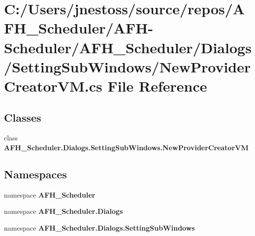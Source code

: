 \section{C\+:/\+Users/jnestoss/source/repos/\+A\+F\+H\+\_\+\+Scheduler/\+A\+F\+H-\/\+Scheduler/\+A\+F\+H\+\_\+\+Scheduler/\+Dialogs/\+Setting\+Sub\+Windows/\+New\+Provider\+Creator\+VM.cs File Reference}
\label{_new_provider_creator_v_m_8cs}
\subsection*{Classes}
\begin{DoxyCompactItemize}
\item 
class \textbf{ A\+F\+H\+\_\+\+Scheduler.\+Dialogs.\+Setting\+Sub\+Windows.\+New\+Provider\+Creator\+VM}
\end{DoxyCompactItemize}
\subsection*{Namespaces}
\begin{DoxyCompactItemize}
\item 
namespace \textbf{ A\+F\+H\+\_\+\+Scheduler}
\item 
namespace \textbf{ A\+F\+H\+\_\+\+Scheduler.\+Dialogs}
\item 
namespace \textbf{ A\+F\+H\+\_\+\+Scheduler.\+Dialogs.\+Setting\+Sub\+Windows}
\end{DoxyCompactItemize}
